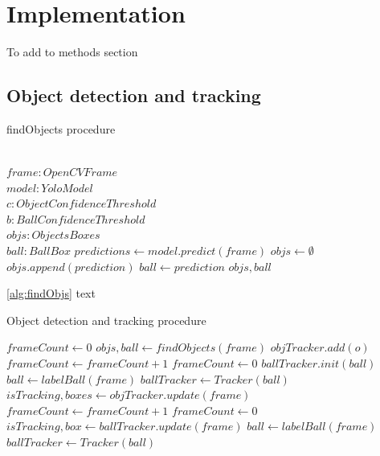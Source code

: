 \documentclass[
11pt,
twoside
]{report}
\begin{document}
\chapter{Implementation}







To add to methods section



\section{Object detection and tracking}


\begin{algorithm}[H]
\begin{algorithmic}
\caption{findObjects procedure}\label{alg:findObjs}
\Require \\
    $frame: OpenCVFrame$ \\
    $model: YoloModel$ \\
    $c: ObjectConfidenceThreshold$ \\
    $b: BallConfidenceThreshold$
\Ensure \\
    $objs: ObjectsBoxes$ \\
    $ball: BallBox$
\State
\State $predictions \gets model.predict(frame)$
\State $objs \gets \emptyset$
        \State $objs.append(prediction)$
    \EndIf
        \State $ball \gets prediction$
    \EndIf
\EndFor
\State
\Return $objs, ball$
\end{algorithmic}
\end{algorithm}


\ref{alg:findObjs} text


\begin{algorithm}[H]
\begin{algorithmic}
\caption{Object detection and tracking procedure}\label{alg:detect_tracking}
\State $frameCount \gets 0$
        \State $objs, ball \gets findObjects(frame)$
                \State $objTracker.add(o)$
            \EndFor
            \State $frameCount \gets frameCount + 1$
        \Else
            \State $frameCount \gets 0$
        \EndIf
            \State $ballTracker.init(ball)$
        \Else
            \State $ball \gets labelBall(frame)$
            \State $ballTracker \gets Tracker(ball)$
        \EndIf
    \Else
        \State $isTracking, boxes \gets objTracker.update(frame)$
            \State $frameCount \gets frameCount + 1$
        \Else
            \State $frameCount \gets 0$
        \EndIf
        \State $isTracking, box \gets ballTracker.update(frame)$
            \State $ball \gets labelBall(frame)$
            \State $ballTracker \gets Tracker(ball)$
        \EndIf
    \EndIf
\EndFor
\end{algorithmic}
\end{algorithm}
\end{document}
